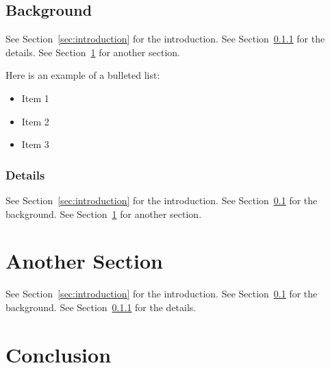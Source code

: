 \documentclass[12pt]{article}
\begin{document}
\subsection{Background}
\label{sec:background}
See Section~\ref{sec:introduction} for the introduction.
See Section~\ref{sec:details} for the details.
See Section~\ref{sec:another-section} for another section.

Here is an example of a bulleted list:
\begin{itemize}
  \item Item 1
  \item Item 2
  \item Item 3
\end{itemize}

\subsubsection{Details}
\label{sec:details}
See Section~\ref{sec:introduction} for the introduction.
See Section~\ref{sec:background} for the background.
See Section~\ref{sec:another-section} for another section.

\section{Another Section}
\label{sec:another-section}
See Section~\ref{sec:introduction} for the introduction.
See Section~\ref{sec:background} for the background.
See Section~\ref{sec:details} for the details.

\newpage
\section{Conclusion}
\label{sec:conclusion}

\newpage
\printbibliography
\end{document}
